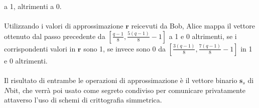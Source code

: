 a 1, altrimenti a 0.\\
\\
Utilizzando i valori di approssimazione $\mathbf{r}$ reicevuti da Bob, Alice
mappa il vettore ottenuto dal passo precedente da
$[\frac{q-1}{8},\frac{5(q-1)}{8}-1]$ a 1 e 0 altrimenti, se i corrispondenti
valori in $\mathbf{r}$ sono 1, se invece sono 0 da
$[\frac{3(q-1)}{8},\frac{7(q-1)}{8}-1]$ in 1 e 0 altrimenti.\\
\\
Il risultato di entrambe le operazioni di approssimazione è il vettore binario
$\mathbf{s}_s$ di $N$bit, che verrà poi usato come segreto condiviso per
comunicare privatamente attaverso l'uso di schemi di crittografia simmetrica.\\
